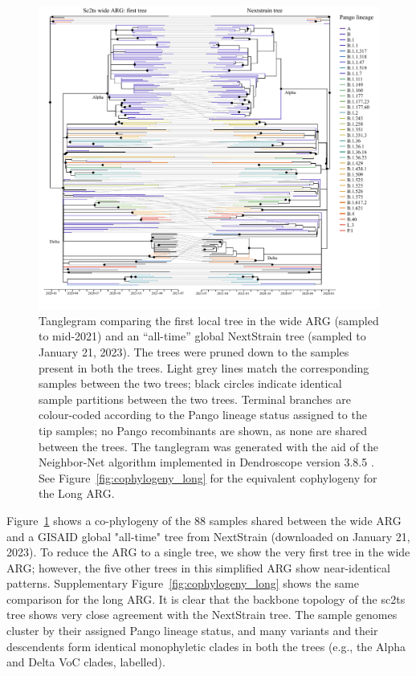 \documentclass{article}
\begin{document}
\begin{figure} \centering
\includegraphics[width=\textwidth]{figures/cophylogeny_wide.pdf}
\caption{\label{fig:cophylogeny} Tanglegram comparing the first local tree in the wide ARG (sampled to mid-2021) and an “all-time” global NextStrain tree (sampled to January 21, 2023). The trees were pruned down to the samples present in both the trees. Light grey lines match the corresponding samples between the two trees; black circles indicate identical sample partitions between the two trees. Terminal branches are colour-coded according to the Pango lineage status assigned to the tip samples; no Pango recombinants are shown, as none are shared between the trees. The tanglegram was generated with the aid of the Neighbor-Net algorithm \citep{Scornavacca2011-mg} implemented in Dendroscope version 3.8.5 \citep{Huson2012-ys}. See Figure~\ref{fig:cophylogeny_long} for the equivalent cophylogeny for the Long ARG.}
\end{figure}

Figure~\ref{fig:cophylogeny} shows a co-phylogeny of the 88 samples shared between the wide ARG and a GISAID global "all-time" tree from NextStrain (downloaded on January 21, 2023). To reduce the ARG to a single tree, we show the very first tree in the wide ARG; however, the five other trees in this simplified ARG show near-identical patterns. Supplementary Figure~\ref{fig:cophylogeny_long} shows the same comparison for the long ARG. It is clear that the backbone topology of the sc2ts tree shows very close agreement with the NextStrain tree. The sample genomes cluster by their assigned Pango lineage status, and many variants and their descendents form identical monophyletic clades in both the trees (e.g., the Alpha and Delta VoC clades, labelled).
\end{document}
